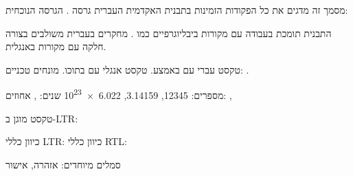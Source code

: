\documentclass{hebrew-academic-template}
\date{\textenglish{January 2026}}
\begin{document}
\maketitle
\tableofcontents
\listoffigures
\listoftables
\newpage



מסמך זה מדגים את כל הפקודות הזמינות בתבנית האקדמית העברית גרסה \en{\clsversion}.
הגרסה הנוכחית: \en{\clsversion} %

התבנית תומכת בעבודה עם מקורות ביבליוגרפיים כמו \cite{vaswani2017attention,devlin2018bert}.
מחקרים בעברית \cite{hebrew_nlp_2023} משולבים בצורה חלקה עם מקורות באנגלית.




טקסט עברי עם  באמצע.
טקסט אנגלי עם  בתוכו.
מונחים טכניים: .

מספרים: \num{12345}, \num{3.14159}, \num{6.022e23}
שנים: , 
אחוזים: , 

טקסט מוגן ב-LTR: 

כיוון כללי LTR: 
כיוון כללי RTL: 

סמלים מיוחדים: \warningsymbol{} אזהרה, \checksymbol{} אישור




\end{document}
